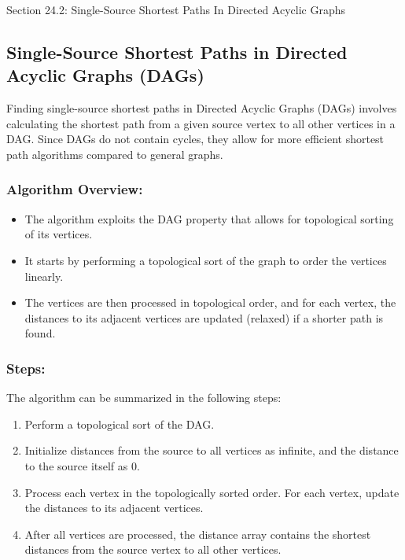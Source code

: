 \begin{notes}{Section 24.2: Single-Source Shortest Paths In Directed Acyclic Graphs}
    \subsection*{Single-Source Shortest Paths in Directed Acyclic Graphs (DAGs)}

    Finding single-source shortest paths in Directed Acyclic Graphs (DAGs) involves calculating the shortest path from a given source vertex to all other vertices in a DAG. Since DAGs do not contain 
    cycles, they allow for more efficient shortest path algorithms compared to general graphs. \vspace*{1em}
    
    \subsubsection*{Algorithm Overview:}
    
    \begin{itemize}
        \item The algorithm exploits the DAG property that allows for topological sorting of its vertices.
        \item It starts by performing a topological sort of the graph to order the vertices linearly.
        \item The vertices are then processed in topological order, and for each vertex, the distances to its adjacent vertices are updated (relaxed) if a shorter path is found.
    \end{itemize}
    
    \subsubsection*{Steps:}
    
    The algorithm can be summarized in the following steps:
    \begin{enumerate}
        \item Perform a topological sort of the DAG.
        \item Initialize distances from the source to all vertices as infinite, and the distance to the source itself as 0.
        \item Process each vertex in the topologically sorted order. For each vertex, update the distances to its adjacent vertices.
        \item After all vertices are processed, the distance array contains the shortest distances from the source vertex to all other vertices.
    \end{enumerate}
    

\end{notes}
